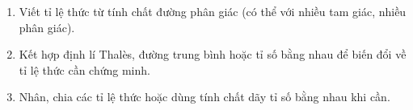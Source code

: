 \begin{enumerate}
\item Viết tỉ lệ thức từ tính chất đường phân giác (có thể với nhiều tam giác, nhiều phân giác).
\item Kết hợp định lí Thalès, đường trung bình hoặc tỉ số bằng nhau để biến đổi về tỉ lệ thức cần chứng minh.
\item Nhân, chia các tỉ lệ thức hoặc dùng tính chất dãy tỉ số bằng nhau khi cần.
\end{enumerate}
